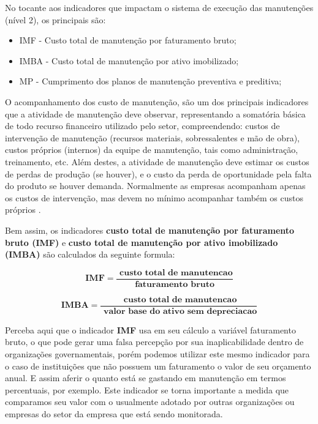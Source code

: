 No tocante aos indicadores que impactam o sistema de execução das manutenções (nível 2), os principais são:

\begin{itemize}
	\item IMF - Custo total de manutenção por faturamento bruto;
	\item IMBA - Custo total de manutenção por ativo imobilizado;
	\item MP - Cumprimento dos planos de manutenção preventiva e preditiva;
	\end{itemize}

O acompanhamento dos custo de manutenção, são um dos principais indicadores que a atividade de manutenção deve observar, representando a somatória básica de todo recurso financeiro utilizado pelo setor, compreendendo: custos de intervenção de manutenção (recursos materiais, sobressalentes e mão de obra), custos próprios (internos) da equipe de manutenção, tais como administração, treinamento, etc. Além destes, a atividade de manutenção deve estimar os custos de perdas de produção (se houver), e o custo da perda de oportunidade pela falta do produto se houver demanda. Normalmente as empresas acompanham apenas os custos de intervenção, mas devem no mínimo acompanhar também os custos próprios \cite{ZEN2008}.

Bem assim, os indicadores \textbf{custo total de manutenção por faturamento bruto (IMF)} e \textbf{custo total de manutenção por ativo imobilizado (IMBA)} são calculados da seguinte formula: 

\begin{equation}
\label{eqn04}
	\mathbf{IMF} = \mathbf{\frac{\textrm{ custo total de manutencao}}{\textrm{faturamento bruto}}} 
\end{equation}

\begin{equation}
\label{eqn05}
	\mathbf{IMBA} = \mathbf{\frac{\textrm{ custo total de manutencao}}{\textrm{ valor base do ativo sem depreciacao}}} 
\end{equation}

Perceba aqui que o indicador \textbf{IMF} usa em seu cálculo a variável faturamento bruto, o que pode gerar uma falsa percepção por sua inaplicabilidade dentro de organizações governamentais, porém podemos utilizar este mesmo indicador para o caso de instituições que não possuem um faturamento o valor de seu orçamento anual. E assim aferir o quanto está se gastando em manutenção em termos percentuais, por exemplo. Este indicador se torna importante a medida que comparamos seu valor com o usualmente adotado por outras organizações ou empresas do setor da empresa que está sendo monitorada.

